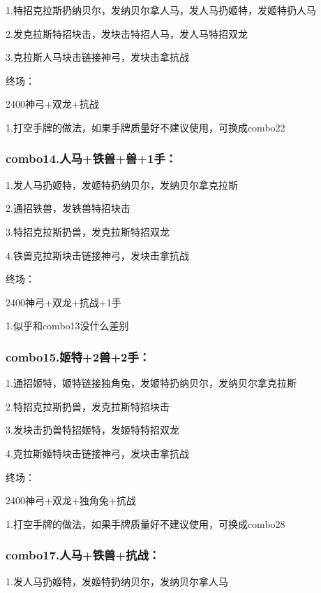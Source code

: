 \documentclass[
]{article}
\begin{document}
1.特招克拉斯扔纳贝尔，发纳贝尔拿人马，发人马扔姬特，发姬特扔人马

2.发克拉斯特招块击，发块击特招人马，发人马特招双龙

3.克拉斯人马块击链接神弓，发块击拿抗战

终场：

2400神弓+双龙+抗战

1.打空手牌的做法，如果手牌质量好不建议使用，可换成combo22

\hypertarget{combo14.ux4ebaux9a6cux94c1ux517dux517d1ux624b}{%
\subsubsection{combo14.人马+铁兽+兽+1手：}\label{combo14.ux4ebaux9a6cux94c1ux517dux517d1ux624b}}

1.发人马扔姬特，发姬特扔纳贝尔，发纳贝尔拿克拉斯

2.通招铁兽，发铁兽特招块击

3.特招克拉斯扔兽，发克拉斯特招双龙

4.铁兽克拉斯块击链接神弓，发块击拿抗战

终场：

2400神弓+双龙+抗战+1手

1.似乎和combo13没什么差别

\hypertarget{combo15.ux59ecux72792ux517d2ux624b}{%
\subsubsection{combo15.姬特+2兽+2手：}\label{combo15.ux59ecux72792ux517d2ux624b}}

1.通招姬特，姬特链接独角兔，发姬特扔纳贝尔，发纳贝尔拿克拉斯

2.特招克拉斯扔兽，发克拉斯特招块击

3.发块击扔兽特招姬特，发姬特特招双龙

4.克拉斯姬特块击链接神弓，发块击拿抗战

终场：

2400神弓+双龙+独角兔+抗战

1.打空手牌的做法，如果手牌质量好不建议使用，可换成combo28

\hypertarget{combo17.ux4ebaux9a6cux94c1ux517dux6297ux6218}{%
\subsubsection{combo17.人马+铁兽+抗战：}\label{combo17.ux4ebaux9a6cux94c1ux517dux6297ux6218}}

1.发人马扔姬特，发姬特扔纳贝尔，发纳贝尔拿人马
\end{document}

